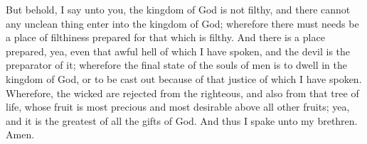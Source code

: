 \bverse \iffalse But behold, I say unto you, the kingdom of God is not filthy, and there cannot any unclean thing enter into the kingdom of God; wherefore there must needs be a place of filthiness prepared for that which is filthy. \fi
But behold, I say unto you, the kingdom of God is not filthy, and there cannot any unclean thing enter into the kingdom of God; wherefore there must needs be a place of filthiness prepared for that which is filthy.
\bverse \iffalse And there is a place prepared, yea, even that awful hell of which I have spoken, and the devil is the preparator of it; wherefore the final state of the souls of men is to dwell in the kingdom of God, or to be cast out because of that justice of which I have spoken. \fi
And there is a place prepared, yea, even that awful hell of which I have spoken, and the devil is the preparator of it; wherefore the final state of the souls of men is to dwell in the kingdom of God, or to be cast out because of that justice of which I have spoken.
\bverse \iffalse Wherefore, the wicked are rejected from the righteous, and also from that tree of life, whose fruit is most precious and most desirable above all other fruits; yea, and it is the greatest of all the gifts of God. And thus I spake unto my brethren. Amen. \fi
Wherefore, the wicked are rejected from the righteous, and also from that tree of life, whose fruit is most precious and most desirable above all other fruits; yea, and it is the greatest of all the gifts of God. And thus I spake unto my brethren. Amen.

